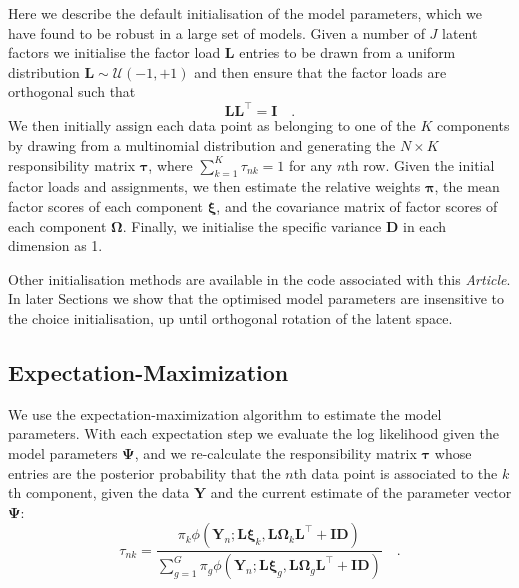 \documentclass[twocolumn]{aastex61}
\newcommand{\vect}[1]{\boldsymbol{\mathbf{#1}}}
\renewcommand{\vec}[1]{\vect{#1}}
\newcommand{\weight}{\pi}
\newcommand{\data}{\textbf{Y}}
\newcommand{\vecdata}{\vec\data}
\newcommand{\transpose}{^\intercal}
\newcommand{\eye}{\textbf{I}}
\newcommand{\factorloads}{\textbf{L}}
\newcommand{\specificvariance}{\vec{D}}
\newcommand{\scoremeans}{\vec\xi}
\newcommand{\scorecovs}{\vec\Omega}
\newcommand{\NumData}{N}
\newcommand{\numdata}{n}
\newcommand{\NumLatentFactors}{J}
\newcommand{\NumComponents}{K}
\newcommand{\numcomponents}{k}
\begin{document}
Here we describe the default initialisation of the model parameters, which
we have found to be robust in a large set of models. Given a number of
$\NumLatentFactors$ latent factors we initialise the factor load
$\factorloads$ entries to be drawn from a uniform distribution
$\factorloads \sim \mathcal{U}\left(-1, +1\right)$ and then ensure that
the factor loads are orthogonal such that
\begin{equation}
	\factorloads \factorloads\transpose = \eye \quad .
\end{equation}
% 	
We then initially assign each data point as belonging to one of the
$\NumComponents$ components by drawing from a multinomial distribution
and generating the $\NumData \times \NumComponents$ responsibility matrix $\vec\tau$,
where $\sum_{k=1}^{K} \tau_{nk} = 1$ for any $n$th row. Given the initial
factor loads and assignments, we then estimate the relative weights
$\vec\pi$, the mean factor scores of each component $\scoremeans$, and
the covariance matrix of factor scores of each component $\scorecovs$.
Finally, we initialise the specific variance $\specificvariance$ in each
dimension as 1. 

Other initialisation methods are available in the code 
associated with this \emph{Article}. In later Sections we show that 
the optimised model parameters are insensitive to the choice initialisation, 
up until orthogonal rotation of the latent space.


\subsection{Expectation-Maximization}

We use the expectation-maximization algorithm to estimate the model parameters.
With each expectation step we evaluate the log likelihood given the model 
parameters $\vec\Psi$, and we re-calculate the responsibility 
matrix $\vec\tau$ whose entries are the posterior probability
that the $\numdata$th data point is associated to the $\numcomponents$th component,
given the data $\vecdata$ and the current estimate of the 
parameter vector $\vec\Psi$:
\begin{equation}
	\tau_{\numdata\numcomponents} = \frac{\weight_\numcomponents\phi(\vecdata_\numdata;\factorloads\scoremeans_\numcomponents, \factorloads\scorecovs_\numcomponents\factorloads\transpose + \eye\specificvariance)}{\sum_{g=1}^{G}\weight_g\phi(\vecdata_\numdata;\factorloads\scoremeans_g, \factorloads\scorecovs_g\factorloads\transpose + \eye\specificvariance)} \quad .
\end{equation}
\end{document}
